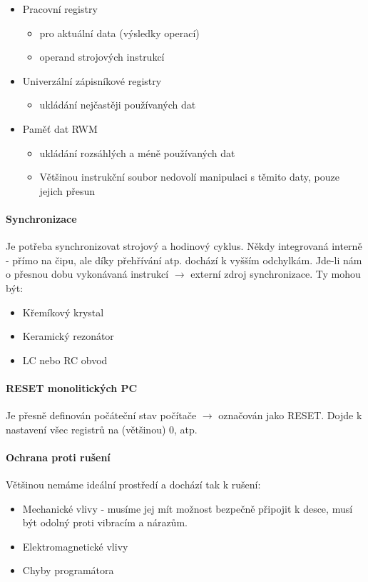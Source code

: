 \documentclass[10pt,a4paper]{article}
\begin{document}
\begin{itemize}
\item Pracovní registry
\begin{itemize}
\item pro aktuální data (výsledky operací)
\item operand strojových instrukcí
\end{itemize}
\item Univerzální zápisníkové registry
\begin{itemize}
\item ukládání nejčastěji používaných dat
\end{itemize}
\item Paměť dat RWM
\begin{itemize}
\item ukládání rozsáhlých a méně používaných dat
\item Většinou instrukční soubor nedovolí manipulaci s těmito daty, pouze jejich přesun
\end{itemize}
\end{itemize}
\paragraph{Synchronizace}
Je potřeba synchronizovat strojový a hodinový cyklus. Někdy integrovaná interně - přímo na čipu, ale díky přehřívání atp. dochází k vyšším odchylkám. Jde-li nám o přesnou dobu vykonávaná instrukcí $\rightarrow$ externí zdroj synchronizace. Ty mohou být:


\begin{itemize}
\item Křemíkový krystal
\item Keramický rezonátor
\item LC nebo RC obvod
\end{itemize}
\paragraph{RESET monolitických PC}
Je přesně definován počáteční stav počítače $\rightarrow$ označován jako RESET. Dojde k nastavení všec registrů na (většinou) 0, atp.

\paragraph{Ochrana proti rušení} 
Většinou nemáme ideální prostředí a dochází tak k rušení:

\begin{itemize}
\item Mechanické vlivy - musíme jej mít možnost bezpečně připojit k desce, musí být odolný proti vibracím a nárazům.
\item Elektromagnetické vlivy
\item Chyby programátora
\end{itemize}
\end{document}
